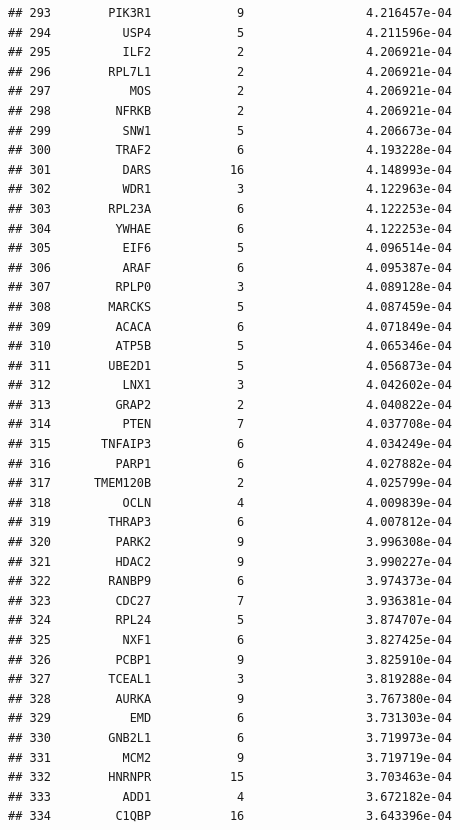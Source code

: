\documentclass[
]{article}
\begin{document}
\begin{verbatim}
## 293        PIK3R1            9                 4.216457e-04
## 294          USP4            5                 4.211596e-04
## 295          ILF2            2                 4.206921e-04
## 296        RPL7L1            2                 4.206921e-04
## 297           MOS            2                 4.206921e-04
## 298         NFRKB            2                 4.206921e-04
## 299          SNW1            5                 4.206673e-04
## 300         TRAF2            6                 4.193228e-04
## 301          DARS           16                 4.148993e-04
## 302          WDR1            3                 4.122963e-04
## 303        RPL23A            6                 4.122253e-04
## 304         YWHAE            6                 4.122253e-04
## 305          EIF6            5                 4.096514e-04
## 306          ARAF            6                 4.095387e-04
## 307         RPLP0            3                 4.089128e-04
## 308        MARCKS            5                 4.087459e-04
## 309         ACACA            6                 4.071849e-04
## 310         ATP5B            5                 4.065346e-04
## 311        UBE2D1            5                 4.056873e-04
## 312          LNX1            3                 4.042602e-04
## 313         GRAP2            2                 4.040822e-04
## 314          PTEN            7                 4.037708e-04
## 315       TNFAIP3            6                 4.034249e-04
## 316         PARP1            6                 4.027882e-04
## 317      TMEM120B            2                 4.025799e-04
## 318          OCLN            4                 4.009839e-04
## 319        THRAP3            6                 4.007812e-04
## 320         PARK2            9                 3.996308e-04
## 321         HDAC2            9                 3.990227e-04
## 322        RANBP9            6                 3.974373e-04
## 323         CDC27            7                 3.936381e-04
## 324         RPL24            5                 3.874707e-04
## 325          NXF1            6                 3.827425e-04
## 326         PCBP1            9                 3.825910e-04
## 327        TCEAL1            3                 3.819288e-04
## 328         AURKA            9                 3.767380e-04
## 329           EMD            6                 3.731303e-04
## 330        GNB2L1            6                 3.719973e-04
## 331          MCM2            9                 3.719719e-04
## 332        HNRNPR           15                 3.703463e-04
## 333          ADD1            4                 3.672182e-04
## 334         C1QBP           16                 3.643396e-04

\end{verbatim}
\end{document}
